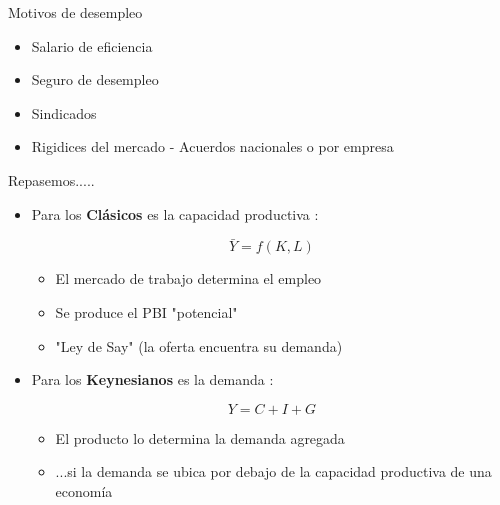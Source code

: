 \documentclass{beamer}
\begin{document}
\begin{frame}{Motivos de desempleo}

\begin{itemize}
    \item Salario de  eficiencia
    \item Seguro de desempleo
    \item Sindicados
    \item Rigidices del mercado - Acuerdos nacionales o por empresa    
\end{itemize}

\end{frame}

\begin{frame}{Repasemos.....}

    \begin{itemize}
        \item Para los \textbf{Clásicos} es la capacidad productiva \faCogs:
            \begin{center}
            \begin{tcolorbox}[width=2in,
                  interior hidden,
                  boxsep=0pt,
                  left=0pt,
                  right=0pt,
                  top=2pt,
                  ]%
                    $$ \bar{Y}=f(K, L) $$
             \end{tcolorbox}
             \end{center}
             
            \begin{itemize}
            \item El mercado de trabajo determina el empleo
            \item Se produce el PBI "potencial"
              \item "Ley de Say" (la oferta encuentra su demanda)
            \end{itemize}
        
        \item Para los \textbf{Keynesianos} es la demanda \faShoppingBasket:
            
            \begin{center}
            \begin{tcolorbox}[width=2in,
                  interior hidden,
                  boxsep=0pt,
                  left=0pt,
                  right=0pt,
                  top=2pt,
                  ]%
                    $$ Y = C + I + G $$
             \end{tcolorbox}
             \end{center}
             
            \begin{itemize}
            \item El producto lo determina la demanda agregada
            \item ...si la demanda se ubica por debajo de la capacidad productiva de una economía
            \end{itemize}
    \end{itemize}

\end{frame}
\end{document}
